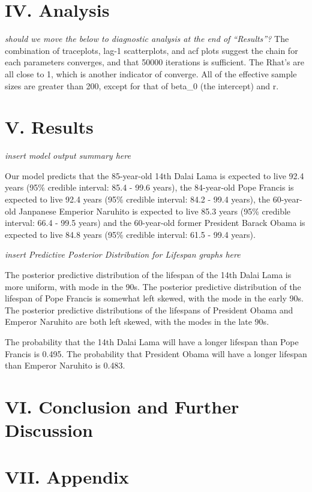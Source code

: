 \documentclass[]{article}
\begin{document}
\hypertarget{iv.-analysis}{%
\section{IV. Analysis}\label{iv.-analysis}}

\emph{should we move the below to diagnostic analysis at the end of
``Results''?} The combination of traceplots, lag-1 scatterplots, and acf
plots suggest the chain for each parameters converges, and that 50000
iterations is sufficient. The Rhat's are all close to 1, which is
another indicator of converge. All of the effective sample sizes are
greater than 200, except for that of beta\_0 (the intercept) and r.

\hypertarget{v.-results}{%
\section{V. Results}\label{v.-results}}

\emph{insert model output summary here}

Our model predicts that the 85-year-old 14th Dalai Lama is expected to
live 92.4 years (95\% credible interval: 85.4 - 99.6 years), the
84-year-old Pope Francis is expected to live 92.4 years (95\% credible
interval: 84.2 - 99.4 years), the 60-year-old Janpanese Emperior
Naruhito is expected to live 85.3 years (95\% credible interval: 66.4 -
99.5 years) and the 60-year-old former President Barack Obama is
expected to live 84.8 years (95\% credible interval: 61.5 - 99.4 years).

\emph{insert Predictive Posterior Distribution for Lifespan graphs here}

The posterior predictive distribution of the lifespan of the 14th Dalai
Lama is more uniform, with mode in the 90s. The posterior predictive
distribution of the lifespan of Pope Francis is somewhat left skewed,
with the mode in the early 90s. The posterior predictive distributions
of the lifespans of President Obama and Emperor Naruhito are both left
skewed, with the modes in the late 90s.

The probability that the 14th Dalai Lama will have a longer lifespan
than Pope Francis is 0.495. The probability that President Obama will
have a longer lifespan than Emperor Naruhito is 0.483.

\hypertarget{vi.-conclusion-and-further-discussion}{%
\section{VI. Conclusion and Further
Discussion}\label{vi.-conclusion-and-further-discussion}}

\hypertarget{vii.-appendix}{%
\section{VII. Appendix}\label{vii.-appendix}}
\end{document}
